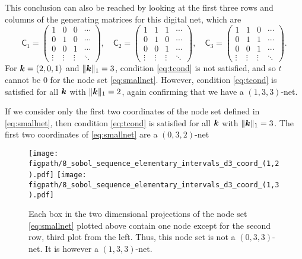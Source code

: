 \documentclass{svproc}
\newcommand{\figpath}{Figures}
\begin{document}
This conclusion can also be reached by looking at the first three rows and columns of the generating matrices for this digital net, which are
\begin{equation*}
	\mathsf{C}_1 = \begin{pmatrix}
		1 & 0 & 0 & \cdots \\ 0 & 1 & 0 & \cdots \\ 0 & 0 & 1 & \cdots \\ \vdots & \vdots & \vdots & \ddots
	\end{pmatrix}, \quad
	\mathsf{C}_2 = \begin{pmatrix}
		1 & 1 & 1 & \cdots \\ 0 & 1 & 0 & \cdots \\ 0 & 0 & 1 & \cdots \\ \vdots & \vdots & \vdots & \ddots
	\end{pmatrix}, \quad
	\mathsf{C}_3 = \begin{pmatrix}
	1 & 1 & 0 & \cdots \\ 0 & 1 & 1 & \cdots \\ 0 & 0 & 1 & \cdots \\ \vdots & \vdots & \vdots & \ddots
\end{pmatrix}.
\end{equation*}
For ${\boldsymbol{k}} = (2, 0, 1)$ and $\lVert {\boldsymbol{k}} \rVert_1 = 3$, condition \eqref{eq:tcond} is not satisfied, and so $t$ cannot be $0$ for the node set  \eqref{eq:smallnet}.  However, condition \eqref{eq:tcond} is satisfied for all ${\boldsymbol{k}}$ with $\lVert {\boldsymbol{k}} \rVert_1 = 2$, again confirming that we have a $(1,3,3)$-net.

If we consider only the first two coordinates of the node set defined in \eqref{eq:smallnet}, then  condition \eqref{eq:tcond} is satisfied for all ${\boldsymbol{k}}$ with $\lVert {\boldsymbol{k}} \rVert_1 = 3$.  The first two coordinates of \eqref{eq:smallnet} are a $(0,3,2)$-net



\begin{figure}
	\centering
	\texttt{[image: \\figpath/8\_sobol\_sequence\_elementary\_intervals\_d3\_coord\_(1,2).pdf]}
	\texttt{[image: \\figpath/8\_sobol\_sequence\_elementary\_intervals\_d3\_coord\_(1,3).pdf]}
	\caption{Each box in the two dimensional projections of the node set \eqref{eq:smallnet} plotted above contain one node except for the second row, third plot from the left.  Thus, this node set is not a $(0,3,3)$-net.  It is however a $(1,3,3)$-net.  \label{fig:elementinterval}}
\end{figure}
\end{document}
